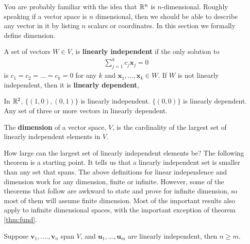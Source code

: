 You are probably familiar with the idea that $\mathbb{R}^n$ is
$n$-dimensional. Roughly speaking if a vector space is $n$
dimensional, then we should be able to describe any vector in it by
listing $n$ scalars or coordinates.  In this section we formally
define dimension. 
\begin{definition}
  A set of vectors $W \in V$, is \textbf{linearly
    independent} if the only solution to
  \begin{align*}
    \sum_{j=1}^k c_j \mathbf{x}_j = 0 
  \end{align*}
  is $c_1 = c_2 = ... = c_k = 0$ for any $k$ and $\mathbf{x}_1, ...,
  \mathbf{x}_k \in W$. If $W$ is not linearly independent, then it is
  \textbf{linearly dependent},
\end{definition}
\begin{example}
  In $\mathbb{R}^2$, $\{(1,0), (0,1)\}$ is linearly independent. $\{(0,0)\}$
  is linearly dependent. Any set of three or more vectors in linearly
  dependent. 
\end{example}
\begin{definition}
  The \textbf{dimension} of a vector space, $V$, is the cardinality of
  the largest set of linearly independent elements in $V$.
\end{definition} 
How large can the largest set of linearly independent elements be? The
following theorem is a starting point. It tells us that a linearly
independent set is smaller than any set that spans. The above
definitions for linear independence and dimension work for any
dimension, finite or infinite. However, some of the theorems that
follow are awkward to state and prove for infinite dimension, so most
of them will assume finite dimension. Most of the important results
also apply to infinite dimensional spaces, with the important
exception of theorem \ref{thm:fund}.
\begin{theorem}\label{thm:spanLin}
  Suppose $\mathbf{v}_1, ...., \mathbf{v}_n$ span $V$, and 
  $\mathbf{u}_1, ..., \mathbf{u}_m$ are linearly independent, then  $n
  \geq m$. 
\end{theorem}
